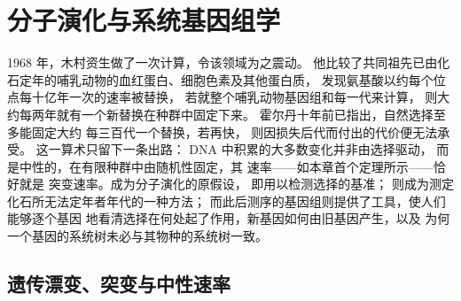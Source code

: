 \chapter{分子演化与系统基因组学}\label{ch:b3:molecular-evolution}

1968 年，木村资生做了一次计算，令该领域为之震动。
他比较了共同祖先已由化石定年的哺乳动物的血红蛋白、细胞色素及其他蛋白质，
发现氨基酸以约每个位点每十亿年一次的速率被替换，
若就整个哺乳动物基因组和每一代来计算，
则大约每两年就有一个新替换在种群中固定下来。
霍尔丹十年前已指出，自然选择至多能固定大约
每三百代一个替换，若再快，
则因损失后代而付出的代价便无法承受。
这一算术只留下一条出路：
DNA 中积累的大多数变化并非由选择驱动，
而是中性的，在有限种群中由随机性固定，其
速率——如本章首个定理所示——恰好就是
突变速率。成为分子演化的原假设，
即用以检测选择的基准；
则成为测定化石所无法定年者年代的一种方法；
而此后测序的基因组则提供了工具，使人们能够逐个基因
地看清选择在何处起了作用，新基因如何由旧基因产生，以及
为何一个基因的系统树未必与其物种的系统树一致。

\section{遗传漂变、突变与中性速率}

